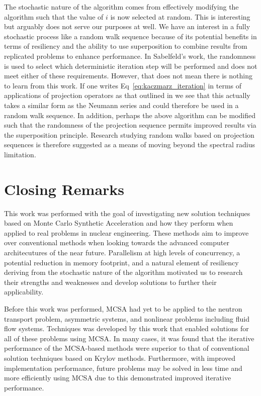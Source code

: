 The stochastic nature of the algorithm comes from effectively
modifying the algorithm such that the value of $i$ is now selected at
random. This is interesting but arguably does not serve our purposes
at well. We have an interest in a fully stochastic process like a
random walk sequence because of its potential benefits in terms of
resiliency and the ability to use superposition to combine results
from replicated problems to enhance performance. In Sabelfeld's work,
the randomness is used to select which deterministic iteration step
will be performed and does not meet either of these
requirements. However, that does not mean there is nothing to learn
from this work. If one writes Eq~\ref{eq:kaczmarz_iteration} in terms
of applications of projection operators as that outlined in
\cite{tanabe_projection_1971} we see that this actually takes a
similar form as the Neumann series and could therefore be used in a
random walk sequence. In addition, perhaps the above algorithm can be
modified such that the randomness of the projection sequence permits
improved results via the superposition principle. Research studying
random walks based on projection sequences is therefore suggested as a
means of moving beyond the spectral radius limitation.

\section{Closing Remarks\ }
\label{sec:closing}

This work was performed with the goal of investigating new solution
techniques based on Monte Carlo Synthetic Acceleration and how they
perform when applied to real problems in nuclear engineering. These
methods aim to improve over conventional methods when looking towards
the advanced computer architecutures of the near future. Parallelism
at high levels of concurrency, a potential reduction in memory
footprint, and a natural element of resiliency deriving from the
stochastic nature of the algorithm motivated us to research their
strengths and weaknesses and develop solutions to further their
applicability. 

Before this work was performed, MCSA had yet to be applied to the
neutron transport problem, asymmetric systems, and nonlinear problems
including fluid flow systems. Techniques was developed by this work
that enabled solutions for all of these problems using MCSA. In many
cases, it was found that the iterative performance of the MCSA-based
methods were superior to that of conventional solution techniques
based on Krylov methods. Furthermore, with improved implementation
performance, future problems may be solved in less time and more
efficiently using MCSA due to this demonstrated improved iterative
performance.

